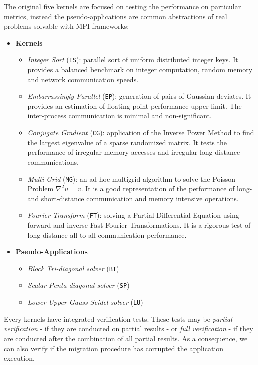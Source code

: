The original five kernels are focused on testing the performance on
particular metrics, instead the pseudo-applications are common abstractions
of real problems solvable with MPI frameworks:
\begin{itemize}
\item \textbf{Kernels}
\begin{itemize}
\item \emph{Integer Sort} (\texttt{IS}): parallel sort of uniform distributed integer 
      keys. It provides a balanced benchmark on integer computation,     random memory and network communication speeds.
\item \emph{Embarrassingly Parallel} (\texttt{EP}): generation of pairs of Gaussian
	  deviates. It provides an estimation of floating-point performance 
	  upper-limit. The inter-process communication is minimal and
	  non-significant.
\item \emph{Conjugate Gradient} (\texttt{CG}): application of the Inverse Power Method
      to find the largest eigenvalue of a sparse randomized matrix. It tests
      the performance of irregular memory accesses and irregular long-distance
      communications.
\item \emph{Multi-Grid} (\texttt{MG}): an ad-hoc multigrid algorithm to solve the
	   Poisson Problem \(\nabla^2u=v\). It is a good representation of the
	   performance of long- and short-distance communication and memory
	   intensive operations.
\item \emph{Fourier Transform} (\texttt{FT}): solving a Partial Differential Equation
      using forward and inverse Fast Fourier Transformations. It is a rigorous 
      test of long-distance all-to-all communication performance.
\end{itemize}
\item \textbf{Pseudo-Applications}
\begin{itemize}
\item \emph{Block Tri-diagonal solver} (\texttt{BT})
\item \emph{Scalar Penta-diagonal solver} (\texttt{SP})
\item \emph{Lower-Upper Gauss-Seidel solver} (\texttt{LU})
\end{itemize}

\end{itemize}

Every kernels have integrated verification tests. These tests may be 
\emph{partial verification} - if they are conducted on partial results - or 
\emph{full verification} - if they are conducted after the combination of
all partial results. As a consequence, we can also verify if the migration
procedure has corrupted the application execution.

